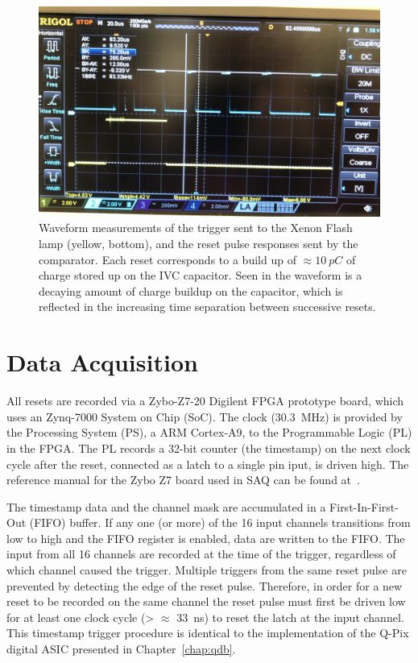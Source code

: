 \begin{figure}[]
\centering
\includegraphics[width=\textwidth]{images/saq_reset_pulse_gem_thickBoard.jpg}
\caption{Waveform measurements of the trigger sent to the Xenon Flash lamp (yellow, bottom), and the reset pulse responses sent by the comparator.
Each reset corresponds to a build up of $\approx 10~\unit{pC}$ of charge stored up on the IVC capacitor.
Seen in the waveform is a decaying amount of charge buildup on the capacitor, which is reflected in the increasing time separation between successive resets.
}
\label{fig:saq_resets}
\end{figure}

\section{Data Acquisition}

All resets are recorded via a Zybo-Z7-20 Digilent FPGA prototype board, which uses an Zynq-7000 System on Chip (SoC).
The clock (30.3~\unit{MHz}) is provided by the Processing System (PS), a ARM Cortex-A9, to the Programmable Logic (PL) in the FPGA.
The PL records a 32-bit counter (the timestamp) on the next clock cycle after the reset, connected as a latch to a single pin iput, is driven high.
The reference manual for the Zybo Z7 board used in SAQ can be found at~\citep{zybo_zy_reference}.

The timestamp data and the channel mask are accumulated in a First-In-First-Out (FIFO) buffer.
If any one (or more) of the 16 input channels transitions from low to high and the FIFO register is enabled, data are written to the FIFO.
The input from all 16 channels are recorded at the time of the trigger, regardless of which channel caused the trigger.
Multiple triggers from the same reset pulse are prevented by detecting the edge of the reset pulse.
Therefore, in order for a new reset to be recorded on the same channel the reset pulse must first be driven low for at least one clock cycle (> $\approx$ 33~\unit{ns}) to reset the latch at the input channel.
This timestamp trigger procedure is identical to the implementation of the Q-Pix digital ASIC presented in Chapter~\ref{chap:qdb}.

